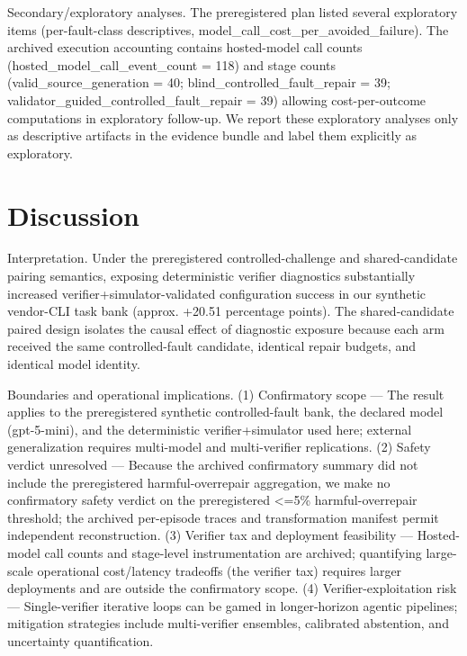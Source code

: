 \documentclass[conference]{IEEEtran}
\begin{document}
Secondary/exploratory analyses. The preregistered plan listed several exploratory items (per-fault-class descriptives, model\_call\_cost\_per\_avoided\_failure). The archived execution accounting contains hosted-model call counts (hosted\_model\_call\_event\_count = 118) and stage counts (valid\_source\_generation = 40; blind\_controlled\_fault\_repair = 39; validator\_guided\_controlled\_fault\_repair = 39) allowing cost-per-outcome computations in exploratory follow-up. We report these exploratory analyses only as descriptive artifacts in the evidence bundle and label them explicitly as exploratory.

\section{Discussion}
Interpretation. Under the preregistered controlled-challenge and shared-candidate pairing semantics, exposing deterministic verifier diagnostics substantially increased verifier+simulator-validated configuration success in our synthetic vendor-CLI task bank (approx. +20.51 percentage points). The shared-candidate paired design isolates the causal effect of diagnostic exposure because each arm received the same controlled-fault candidate, identical repair budgets, and identical model identity.

Boundaries and operational implications. (1) Confirmatory scope --- The result applies to the preregistered synthetic controlled-fault bank, the declared model (gpt-5-mini), and the deterministic verifier+simulator used here; external generalization requires multi-model and multi-verifier replications. (2) Safety verdict unresolved --- Because the archived confirmatory summary did not include the preregistered harmful-overrepair aggregation, we make no confirmatory safety verdict on the preregistered <=5\% harmful-overrepair threshold; the archived per-episode traces and transformation manifest permit independent reconstruction. (3) Verifier tax and deployment feasibility --- Hosted-model call counts and stage-level instrumentation are archived; quantifying large-scale operational cost/latency tradeoffs (the verifier tax) requires larger deployments and are outside the confirmatory scope. (4) Verifier-exploitation risk --- Single-verifier iterative loops can be gamed in longer-horizon agentic pipelines; mitigation strategies include multi-verifier ensembles, calibrated abstention, and uncertainty quantification.
\end{document}
